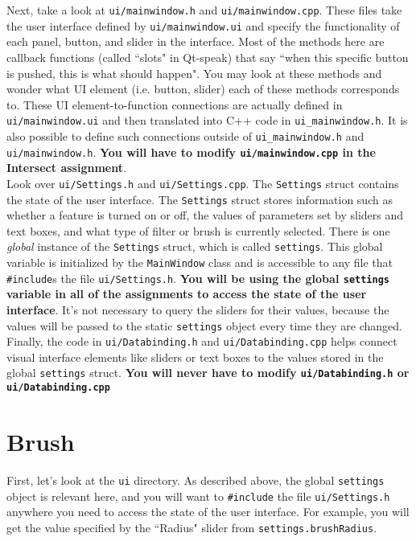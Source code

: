 \documentclass[landscape,twocolumn,letterpaper]{article}
\begin{document}
\noindent
Next, take a look at \texttt{ui/mainwindow.h} and \texttt{ui/mainwindow.cpp}. These files take the user interface defined by \texttt{ui/mainwindow.ui} and specify the functionality of each panel, button, and slider in the interface. Most of the methods here are callback functions (called ``slots" in Qt-speak) that say ``when this specific button is pushed, this is what should happen". You may look at these methods and wonder what UI element (i.e. button, slider) each of these methods corresponds to. These UI element-to-function connections are actually defined in \texttt{ui/mainwindow.ui} and then translated into C++ code in
\texttt{ui\_mainwindow.h}. It is also possible to define such connections outside of \texttt{ui\_mainwindow.h} and \texttt{ui/mainwindow.h}. \textbf{You will have to modify \texttt{ui/mainwindow.cpp} in the Intersect assignment}. \\

\noindent
Look over \texttt{ui/Settings.h} and \texttt{ui/Settings.cpp}. The \texttt{Settings} struct contains the state of the user interface. The \texttt{Settings} struct stores information such as whether a feature is turned on or off, the values of parameters set by sliders and text boxes, and what type of filter or brush is currently selected. There is one \emph{global} instance of the \texttt{Settings} struct, which is called \texttt{settings}. This global variable is initialized by the \texttt{MainWindow} class and is accessible to any file that \texttt{\#include}s the file \texttt{ui/Settings.h}. \textbf{You will be using the global \texttt{settings} variable in all of the assignments to access the state of the user interface}. It’s not necessary to query the sliders for their values, because the values will be passed to the static \texttt{settings} object every time they are changed.\\

\noindent
Finally, the code in \texttt{ui/Databinding.h} and \texttt{ui/Databinding.cpp} helps connect visual interface elements like sliders or text boxes to the values stored in the global \texttt{settings} struct. \textbf{You will never have to modify \texttt{ui/Databinding.h} or \texttt{ui/Databinding.cpp}}

\section{Brush}

First, let's look at the \texttt{ui} directory. As described above, the global \texttt{settings} object is relevant here, and you will want to  \texttt{\#include} the file \texttt{ui/Settings.h} anywhere you need to access the state of the user interface. For example, you will get the value specified by the ``Radius" slider from \texttt{settings.brushRadius}.\\
\end{document}
